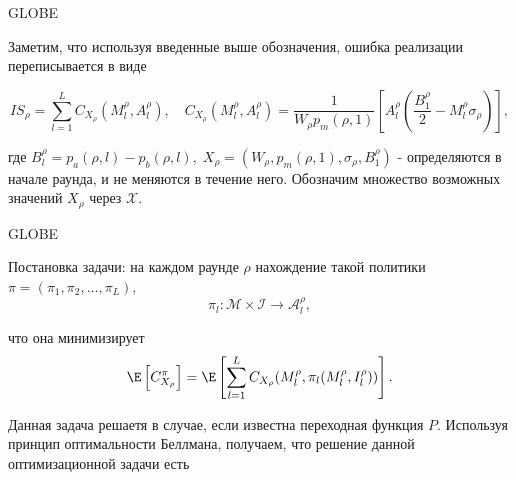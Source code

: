\documentclass[aspectratio=169]{beamer}
\begin{document}
    \begin{frame}{GLOBE}

        Заметим, что используя введенные выше обозначения, ошибка реализации переписывается в виде
        
        \begin{equation*}
            IS_\rho = \sum\limits_{l=1}^L C_{X_\rho}(M_l^\rho, A_l^\rho), \quad C_{X_\rho}(M_l^\rho, A_l^\rho) = \frac{1}{W_\rho p_m(\rho, 1)} \left[ A_l^\rho \left(\frac{B_1^\rho}{2} - M_l^\rho \sigma_\rho \right) \right],
        \end{equation*}
        
        где $B_l^\rho = p_a(\rho, l) - p_b(\rho, l), \; X_\rho = (W_\rho, p_m(\rho, 1), \sigma_\rho, B_1^\rho )$ - определяются в начале раунда, и не меняются в течение него. Обозначим множество возможных значений $X_\rho$ через $\mathcal X$.
    
    \end{frame}

    \begin{frame}{GLOBE}
    
         Постановка задачи: на каждом раунде $\rho$ нахождение такой политики $\pi = (\pi_1, \pi_2, \ldots, \pi_L)$,
         \begin{equation*}
             \pi_l \colon \mathcal M \times \mathcal I \to \mathcal A_l^\rho ,
         \end{equation*}

        что она минимизирует
        \begin{equation*}
            \E \left[ C_{X_\rho}^\pi \right] = \E \left[ \sum\limits_{l=1}^L C_{X_\rho}(M_l^\rho, \pi_l (M_l^\rho, I_l^\rho) ) \right].
        \end{equation*}

        Данная задача решаетя в случае, если известна переходная функция $P$. Используя принцип оптимальности Беллмана, получаем, что решение данной оптимизационной задачи есть
        
         
    \end{frame}
    
\end{document}
